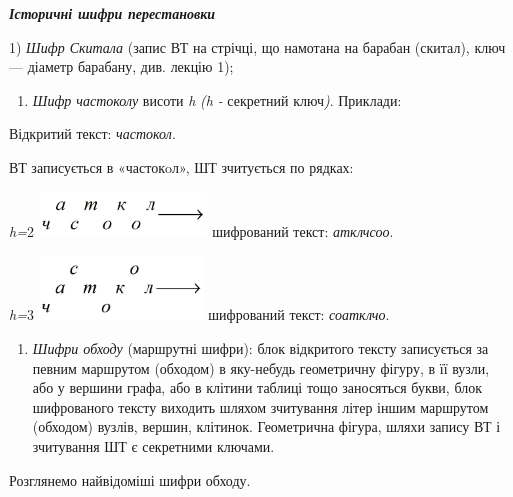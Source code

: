\bigskip


\bigskip

{\centering\bfseries\itshape
Історичні шифри перестановки
\par}


\bigskip


\bigskip

1) \textit{Шифр Скитала} (запис ВТ на стрічці, що намотана на барабан (скитал),
ключ --- діаметр барабану, див. лекцію 1);

\liststyleWWviiiNumxli
\begin{enumerate}
\item \textit{Шифр частоколу} висоти \textit{h}\textit{ }\textit{(}\textit{h
}\textit{{}- }секретний\textit{ }ключ\textit{)}. Приклади:
\end{enumerate}
Відкритий текст: \textit{частокол}. 

ВТ записується в «частокoл», ШТ зчитується по рядках:

{\centering
\textit{h}\textit{=}2\textit{  }
\includegraphics[width=1.7598in,height=0.4681in]{crypt-img/crypt-img62.png} 
шифрований текст: \textit{атклчсоо}.
\par}

{\centering
\textit{h}\textit{=}3\textit{  } 
\includegraphics[width=1.7193in,height=0.6799in]{crypt-img/crypt-img63.png} 
шифрований текст: \textit{соатклчо}.
\par}

\liststyleWWviiiNumxli
\setcounter{saveenum}{\value{enumi}}
\begin{enumerate}
\setcounter{enumi}{\value{saveenum}}
\item \textit{Шифри обходу} (маршрутні шифри): блок відкритого тексту
записується за певним маршрутом (обходом) в яку-небудь геометричну фігуру, в її
вузли, або у вершини графа, або в клітини таблиці тощо заносяться букви, блок
шифрованого тексту виходить шляхом зчитування літер іншим маршрутом (обходом)
вузлів, вершин, клітинок. Геометрична фігура, шляхи запису ВТ і зчитування ШТ є
секретними ключами.
\end{enumerate}
 Розглянемо найвідоміші шифри обходу.

